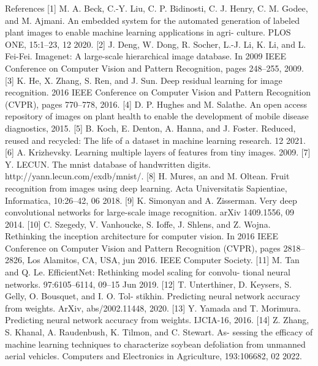 References
[1] M. A. Beck, C.-Y. Liu, C. P. Bidinosti, C. J. Henry, C. M. Godee, and
M. Ajmani. An embedded system for the automated generation of
labeled plant images to enable machine learning applications in agri-
culture. PLOS ONE, 15:1–23, 12 2020.
[2] J. Deng, W. Dong, R. Socher, L.-J. Li, K. Li, and L. Fei-Fei. Imagenet: A
large-scale hierarchical image database. In 2009 IEEE Conference on
Computer Vision and Pattern Recognition, pages 248–255, 2009.
[3] K. He, X. Zhang, S. Ren, and J. Sun. Deep residual learning for image
recognition. 2016 IEEE Conference on Computer Vision and Pattern
Recognition (CVPR), pages 770–778, 2016.
[4] D. P. Hughes and M. Salathe. An open access repository of images on
plant health to enable the development of mobile disease diagnostics,
2015.
[5] B. Koch, E. Denton, A. Hanna, and J. Foster. Reduced, reused and
recycled: The life of a dataset in machine learning research. 12 2021.
[6] A. Krizhevsky. Learning multiple layers of features from tiny images.
2009.
[7] Y. LECUN. The mnist database of handwritten digits.
http://yann.lecun.com/exdb/mnist/.
[8] H. Mures, an and M. Oltean. Fruit recognition from images using deep
learning. Acta Universitatis Sapientiae, Informatica, 10:26–42, 06 2018.
[9] K. Simonyan and A. Zisserman. Very deep convolutional networks
for large-scale image recognition. arXiv 1409.1556, 09 2014.
[10] C. Szegedy, V. Vanhoucke, S. Ioffe, J. Shlens, and Z. Wojna. Rethinking
the inception architecture for computer vision. In 2016 IEEE Conference
on Computer Vision and Pattern Recognition (CVPR), pages 2818–2826,
Los Alamitos, CA, USA, jun 2016. IEEE Computer Society.
[11] M. Tan and Q. Le. EfficientNet: Rethinking model scaling for convolu-
tional neural networks. 97:6105–6114, 09–15 Jun 2019.
[12] T. Unterthiner, D. Keysers, S. Gelly, O. Bousquet, and I. O. Tol-
stikhin. Predicting neural network accuracy from weights. ArXiv,
abs/2002.11448, 2020.
[13] Y. Yamada and T. Morimura. Predicting neural network accuracy from
weights. IJCIA-16, 2016.
[14] Z. Zhang, S. Khanal, A. Raudenbush, K. Tilmon, and C. Stewart. As-
sessing the efficacy of machine learning techniques to characterize
soybean defoliation from unmanned aerial vehicles. Computers and
Electronics in Agriculture, 193:106682, 02 2022.
